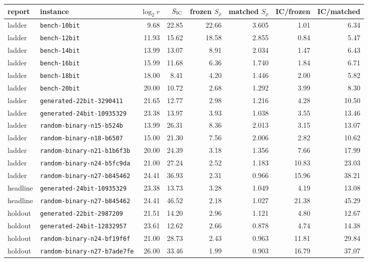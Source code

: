 \begin{tabular}{@{}llrrrrrr@{}}
\toprule
report & instance & $\log_2 r$ & $S_{\rm IC}$ & frozen $S_\rho$ & matched $S_\rho$ & IC/frozen & IC/matched \\
\midrule
ladder & \texttt{bench-10bit} & 9.68 & 22.85 & 22.66 & 3.605 & 1.01 & 6.34 \\
ladder & \texttt{bench-12bit} & 11.93 & 15.62 & 18.58 & 2.855 & 0.84 & 5.47 \\
ladder & \texttt{bench-14bit} & 13.99 & 13.07 & 8.91 & 2.034 & 1.47 & 6.43 \\
ladder & \texttt{bench-16bit} & 15.99 & 11.68 & 6.36 & 1.740 & 1.84 & 6.71 \\
ladder & \texttt{bench-18bit} & 18.00 & 8.41 & 4.20 & 1.446 & 2.00 & 5.82 \\
ladder & \texttt{bench-20bit} & 20.00 & 10.72 & 2.68 & 1.292 & 3.99 & 8.30 \\
ladder & \texttt{generated-22bit-3290411} & 21.65 & 12.77 & 2.98 & 1.216 & 4.28 & 10.50 \\
ladder & \texttt{generated-24bit-10935329} & 23.38 & 13.97 & 3.93 & 1.038 & 3.55 & 13.46 \\
ladder & \texttt{random-binary-n15-b524b} & 13.99 & 26.31 & 8.36 & 2.013 & 3.15 & 13.07 \\
ladder & \texttt{random-binary-n18-b6507} & 15.00 & 21.30 & 7.56 & 2.006 & 2.82 & 10.62 \\
ladder & \texttt{random-binary-n21-b1b6f3b} & 20.00 & 24.39 & 3.18 & 1.356 & 7.66 & 17.99 \\
ladder & \texttt{random-binary-n24-b5fc9da} & 21.00 & 27.24 & 2.52 & 1.183 & 10.83 & 23.03 \\
ladder & \texttt{random-binary-n27-b845462} & 24.41 & 36.93 & 2.31 & 0.966 & 15.96 & 38.21 \\
\addlinespace
headline & \texttt{generated-24bit-10935329} & 23.38 & 13.73 & 3.28 & 1.049 & 4.19 & 13.08 \\
headline & \texttt{random-binary-n27-b845462} & 24.41 & 46.52 & 2.18 & 1.027 & 21.38 & 45.29 \\
\addlinespace
holdout & \texttt{generated-22bit-2987209} & 21.51 & 14.20 & 2.96 & 1.121 & 4.80 & 12.67 \\
holdout & \texttt{generated-24bit-12832957} & 23.61 & 12.62 & 2.66 & 0.878 & 4.74 & 14.38 \\
holdout & \texttt{random-binary-n24-bf19f6f} & 21.00 & 28.73 & 2.43 & 0.963 & 11.81 & 29.84 \\
holdout & \texttt{random-binary-n27-b7ade7fe} & 26.00 & 33.46 & 1.99 & 0.903 & 16.79 & 37.07 \\
\bottomrule
\end{tabular}
